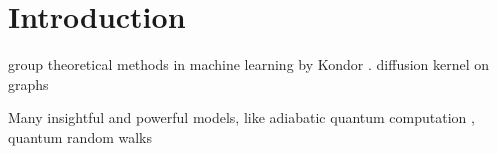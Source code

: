 
\section{Introduction}

group theoretical methods in machine learning by Kondor \cite{kondorGroupTheoreticalMethods2008}.
diffusion kernel on graphs \cite{kondorDiffusionKernelsGraphs2002}

Many insightful and powerful models, like adiabatic quantum computation \cite{farhiQuantumComputationAdiabatic2000}, quantum random walks \cite{childsQuantumInformationProcessing2004} 


